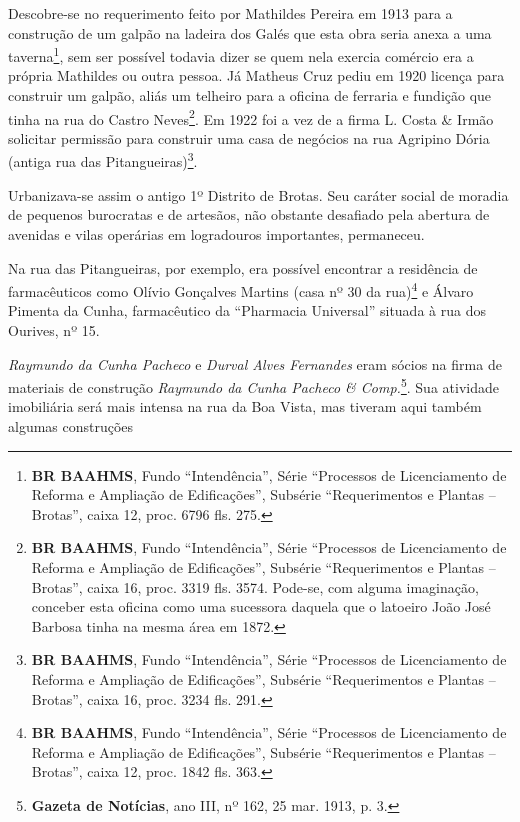 Descobre-se no requerimento feito por Mathildes Pereira em 1913 para a construção de um galpão na ladeira dos Galés que esta obra seria anexa a uma taverna\footnote{\textbf{BR BAAHMS}, Fundo ``Intendência'', Série ``Processos de Licenciamento de Reforma e Ampliação de Edificações'', Subsérie ``Requerimentos e Plantas -- Brotas'', caixa 12, proc. 6796 fls. 275.}, sem ser possível todavia dizer se quem nela exercia comércio era a própria Mathildes ou outra pessoa. Já Matheus Cruz pediu em 1920 licença para construir um galpão, aliás um telheiro para a oficina de ferraria e fundição que tinha na rua do Castro Neves\footnote{\textbf{BR BAAHMS}, Fundo ``Intendência'', Série ``Processos de Licenciamento de Reforma e Ampliação de Edificações'', Subsérie ``Requerimentos e Plantas -- Brotas'', caixa 16, proc. 3319 fls. 3574. Pode-se, com alguma imaginação, conceber esta oficina como uma sucessora daquela que o latoeiro João José Barbosa tinha na mesma área em 1872.}. Em 1922 foi a vez de a firma L. Costa \& Irmão solicitar permissão para construir uma casa de negócios na rua Agripino Dória (antiga rua das Pitangueiras)\footnote{\textbf{BR BAAHMS}, Fundo ``Intendência'', Série ``Processos de Licenciamento de Reforma e Ampliação de Edificações'', Subsérie ``Requerimentos e Plantas -- Brotas'', caixa 16, proc. 3234 fls. 291.}.


Urbanizava-se assim o antigo 1º Distrito de Brotas. Seu caráter social de moradia de pequenos burocratas e de artesãos, não obstante desafiado pela abertura de avenidas e vilas operárias em logradouros importantes, permaneceu.

Na rua das Pitangueiras, por exemplo, era possível encontrar a residência de farmacêuticos como Olívio Gonçalves Martins (casa nº 30 da rua)\footnote{\textbf{BR BAAHMS}, Fundo ``Intendência'', Série ``Processos de Licenciamento de Reforma e Ampliação de Edificações'', Subsérie ``Requerimentos e Plantas -- Brotas'', caixa 12, proc. 1842 fls. 363.} e Álvaro Pimenta da Cunha, farmacêutico da ``Pharmacia Universal'' situada à rua dos Ourives, nº 15\cite[p.~510]{reis_almanak_1903}.

\textit{Raymundo da Cunha Pacheco} e \textit{Durval Alves Fernandes} eram sócios na firma de materiais de construção \textit{Raymundo da Cunha Pacheco \& Comp.}\footnote{\textbf{Gazeta de Notícias}, ano III, nº 162, 25 mar. 1913, p. 3.}. Sua atividade imobiliária será mais intensa na rua da Boa Vista, mas tiveram aqui também algumas construções

